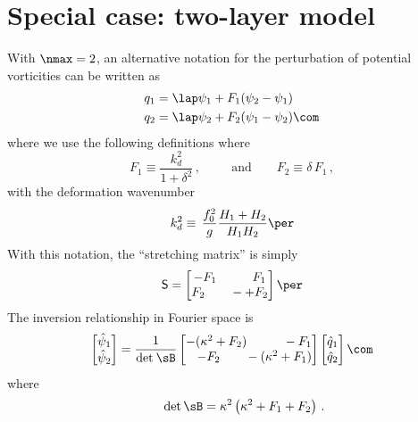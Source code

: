 \documentclass[11pt]{article}
\newcommand{\sS}{\mathsf{S}}
\begin{document}
\section*{Special case: two-layer model}
With $\nmax = 2$, an alternative notation for the perturbation of potential vorticities can be written as
\begin{align}
    q_1 &= \lap \psi_1 + F_1 (\psi_2 - \psi_1) \nonumber\\
    q_2 &= \lap \psi_2 + F_2 (\psi_1  - \psi_2)\com
\end{align}
where we use the following definitions
where
\begin{equation}
F_1 \equiv \frac{k_d^2}{1 + \delta^2}\,, \qquad \:\:\text{and} \qquad F_2 \equiv \delta \,F_1\,,
\end{equation}
with the deformation wavenumber
\begin{equation}
k_d^2 \equiv \, \frac{f_0^2}{g} \frac{H_1+H_2}{H_1 H_2} \per
\end{equation}
With this notation, the ``stretching matrix'' is simply
\begin{equation}
\sS = \begin{bmatrix}
- F_1 \qquad \:\:\:\:F_1\\
F_2 \qquad -  + F_2
\end{bmatrix}\per
\end{equation}
The inversion relationship in Fourier space is
\begin{equation}
\begin{bmatrix}
\hat{\psi}_1\\
\hat{\psi}_2\\
\end{bmatrix}
= \frac{1}{\text{det} \: \sB}
\begin{bmatrix}
-(\kappa^2 + F_2) \qquad \:\:\:\:-F_1\\
\:\:\:\: -F_2 \qquad - (\kappa^2 + F_1)
\end{bmatrix}
\begin{bmatrix}
\hat{q}_1\\
\hat{q}_2\\
\end{bmatrix}\com
\end{equation}
where 
\begin{equation}
\qquad \text{det}\, \sB = \kappa^2\left(\kappa^2 + F_1 + F_2\right)\,.
\end{equation}
\end{document}
